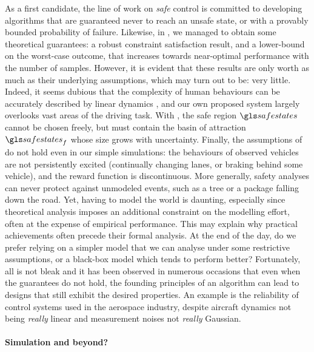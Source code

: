 As a first candidate, the line of work on \emph{safe} control is committed to developing algorithms that are guaranteed never to reach an unsafe state, or with a provably bounded probability of failure. 
Likewise, in , we managed to obtain some theoretical guarantees: a robust constraint satisfaction result, and a lower-bound on the worst-case outcome, that increases towards near-optimal performance with the number of samples. However, it is evident that these results are only worth as much as their underlying assumptions, which may turn out to be: very little. Indeed, it seems dubious that the complexity of human behaviours can be accurately described by linear dynamics , and our own proposed system largely overlooks vast areas of the driving task. With , the safe region $\safestates$ cannot be chosen freely, but must contain the basin of attraction $\safestates_{f}$ whose size grows with uncertainty. Finally, the assumptions of  do not hold even in our simple simulations: the behaviours of observed vehicles are not persistently excited (\ie continually changing lanes, or braking behind some vehicle), and the reward function is discontinuous. More generally, safety analyses can never protect against unmodeled events, such as a tree or a package falling down the road. Yet, having to model the world is daunting, especially since theoretical analysis imposes an additional constraint on the modelling effort, often at the expense of empirical performance. 
This may explain why practical achievements often precede their formal analysis. At the end of the day, do we prefer relying on a simpler model that we can analyse under some restrictive assumptions, or a black-box model which tends to perform better? Fortunately, all is not bleak and it has been observed in numerous occasions that even when the guarantees do not hold, the founding principles of an algorithm can lead to designs that still exhibit the desired properties. An example is the reliability of control systems used in the aerospace industry, despite aircraft dynamics not being \emph{really} linear and measurement noises not \emph{really} Gaussian.


\paragraph{Simulation and beyond?}


